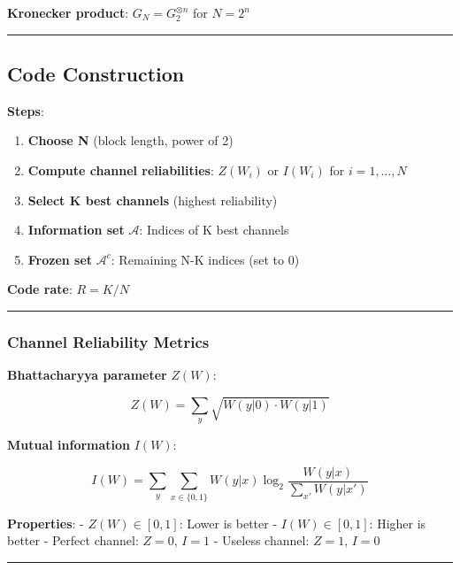 \textbf{Kronecker product}: \(G_N = G_2^{\otimes n}\) for \(N = 2^n\)

\begin{center}\rule{0.5\linewidth}{0.5pt}\end{center}

\subsection{Code Construction}\label{code-construction}

\textbf{Steps}:

\begin{enumerate}
\def\labelenumi{\arabic{enumi}.}
\tightlist
\item
  \textbf{Choose N} (block length, power of 2)
\item
  \textbf{Compute channel reliabilities}: \(Z(W_i)\) or \(I(W_i)\) for
  \(i = 1, \ldots, N\)
\item
  \textbf{Select K best channels} (highest reliability)
\item
  \textbf{Information set} \(\mathcal{A}\): Indices of K best channels
\item
  \textbf{Frozen set} \(\mathcal{A}^c\): Remaining N-K indices (set to
  0)
\end{enumerate}

\textbf{Code rate}: \(R = K/N\)

\begin{center}\rule{0.5\linewidth}{0.5pt}\end{center}

\subsubsection{Channel Reliability
Metrics}\label{channel-reliability-metrics}

\textbf{Bhattacharyya parameter} \(Z(W)\):

\[
Z(W) = \sum_{y} \sqrt{W(y|0) \cdot W(y|1)}
\]

\textbf{Mutual information} \(I(W)\):

\[
I(W) = \sum_{y} \sum_{x \in \{0,1\}} W(y|x) \log_2\frac{W(y|x)}{\sum_{x'} W(y|x')}
\]

\textbf{Properties}: - \(Z(W) \in [0, 1]\): Lower is better -
\(I(W) \in [0, 1]\): Higher is better - Perfect channel: \(Z = 0\),
\(I = 1\) - Useless channel: \(Z = 1\), \(I = 0\)

\begin{center}\rule{0.5\linewidth}{0.5pt}\end{center}

